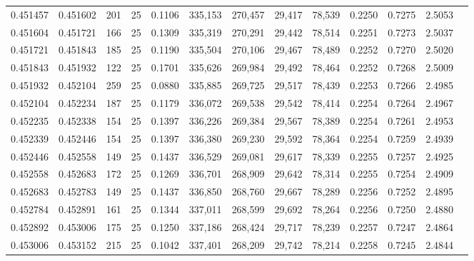 \begin{tabular}{rrrrrrrrrrrrr}
0.451457 & 0.451602 &   201 &  25 &                                     0.1106 & 335,153 & 270,457 &  29,417 &  78,539 & 0.2250 & 0.7275 & 2.5053 \\
0.451604 & 0.451721 &   166 &  25 &                                     0.1309 & 335,319 & 270,291 &  29,442 &  78,514 & 0.2251 & 0.7273 & 2.5037 \\
0.451721 & 0.451843 &   185 &  25 &                                     0.1190 & 335,504 & 270,106 &  29,467 &  78,489 & 0.2252 & 0.7270 & 2.5020 \\
0.451843 & 0.451932 &   122 &  25 &                                     0.1701 & 335,626 & 269,984 &  29,492 &  78,464 & 0.2252 & 0.7268 & 2.5009 \\
0.451932 & 0.452104 &   259 &  25 &                                     0.0880 & 335,885 & 269,725 &  29,517 &  78,439 & 0.2253 & 0.7266 & 2.4985 \\
0.452104 & 0.452234 &   187 &  25 &                                     0.1179 & 336,072 & 269,538 &  29,542 &  78,414 & 0.2254 & 0.7264 & 2.4967 \\
0.452235 & 0.452338 &   154 &  25 &                                     0.1397 & 336,226 & 269,384 &  29,567 &  78,389 & 0.2254 & 0.7261 & 2.4953 \\
0.452339 & 0.452446 &   154 &  25 &                                     0.1397 & 336,380 & 269,230 &  29,592 &  78,364 & 0.2254 & 0.7259 & 2.4939 \\
0.452446 & 0.452558 &   149 &  25 &                                     0.1437 & 336,529 & 269,081 &  29,617 &  78,339 & 0.2255 & 0.7257 & 2.4925 \\
0.452558 & 0.452683 &   172 &  25 &                                     0.1269 & 336,701 & 268,909 &  29,642 &  78,314 & 0.2255 & 0.7254 & 2.4909 \\
0.452683 & 0.452783 &   149 &  25 &                                     0.1437 & 336,850 & 268,760 &  29,667 &  78,289 & 0.2256 & 0.7252 & 2.4895 \\
0.452784 & 0.452891 &   161 &  25 &                                     0.1344 & 337,011 & 268,599 &  29,692 &  78,264 & 0.2256 & 0.7250 & 2.4880 \\
0.452892 & 0.453006 &   175 &  25 &                                     0.1250 & 337,186 & 268,424 &  29,717 &  78,239 & 0.2257 & 0.7247 & 2.4864 \\
0.453006 & 0.453152 &   215 &  25 &                                     0.1042 & 337,401 & 268,209 &  29,742 &  78,214 & 0.2258 & 0.7245 & 2.4844 \\

\end{tabular}
